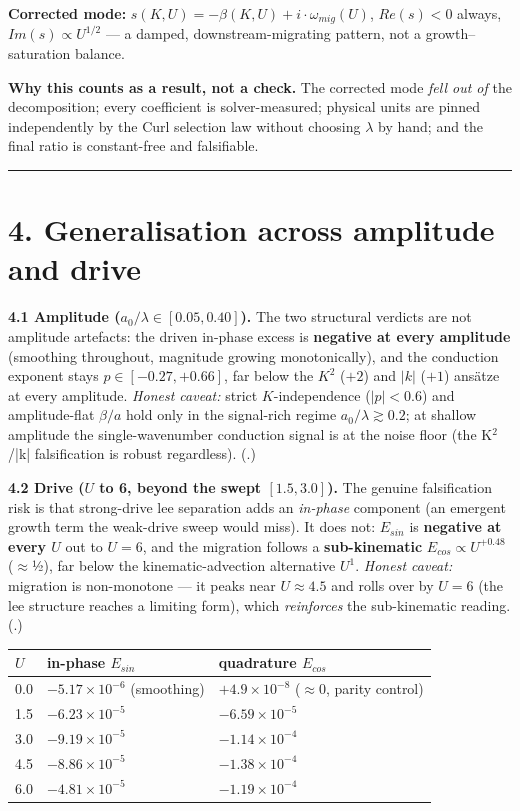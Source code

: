 \documentclass[11pt]{article}
\begin{document}
\textbf{Corrected mode:} $s(K,U) = -\beta (K,U) + i\cdot \omega _{mig}(U)$, $Re(s)<0$ always, $Im(s)\propto U^{1/2}$ — a damped, downstream-migrating pattern, not a growth–saturation balance.


\textbf{Why this counts as a result, not a check.} The corrected mode \emph{fell out of} the decomposition; every coefficient is solver-measured; physical units are pinned independently by the Curl selection law without choosing $\lambda $ by hand; and the final ratio is constant-free and falsifiable.


\medskip\hrule\medskip


\section*{4. Generalisation across amplitude and drive}


\textbf{4.1 Amplitude ($a_{0}/\lambda  \in  [0.05, 0.40]$).} The two structural verdicts are not amplitude artefacts: the driven in-phase excess is \textbf{negative at every amplitude} (smoothing throughout, magnitude growing monotonically), and the conduction exponent stays $p\in [-0.27,+0.66]$, far below the $K^{2}$ ($+2$) and $|k|$ ($+1$) ansätze at every amplitude. \emph{Honest caveat:} strict $K$-independence ($|p|<0.6$) and amplitude-flat $\beta /a$ hold only in the signal-rich regime $a_{0}/\lambda \gtrsim 0.2$; at shallow amplitude the single-wavenumber conduction signal is at the noise floor (the K\ensuremath{^{2}}/|k| falsification is robust regardless). (.)


\textbf{4.2 Drive ($U$ to 6, beyond the swept $[1.5,3.0]$).} The genuine falsification risk is that strong-drive lee separation adds an \emph{in-phase} component (an emergent growth term the weak-drive sweep would miss). It does not: $E_{sin}$ is \textbf{negative at every $U$} out to $U=6$, and the migration follows a \textbf{sub-kinematic} $E_{cos} \propto  U^{+0.48}$ (\ensuremath{\approx}½), far below the kinematic-advection alternative $U^{1}$. \emph{Honest caveat:} migration is non-monotone — it peaks near $U\approx 4.5$ and rolls over by $U=6$ (the lee structure reaches a limiting form), which \emph{reinforces} the sub-kinematic reading. (.)


\begin{center}\small
\begin{tabular}{lll}
\toprule
$U$ & in-phase $E_{sin}$ & quadrature $E_{cos}$ \\
\midrule
0.0 & $-5.17\times 10^{-6}$ (smoothing) & $+4.9\times 10^{-8}$ (\ensuremath{\approx}0, parity control) \\
1.5 & $-6.23\times 10^{-5}$ & $-6.59\times 10^{-5}$ \\
3.0 & $-9.19\times 10^{-5}$ & $-1.14\times 10^{-4}$ \\
4.5 & $-8.86\times 10^{-5}$ & $-1.38\times 10^{-4}$ \\
6.0 & $-4.81\times 10^{-5}$ & $-1.19\times 10^{-4}$ \\
\bottomrule
\end{tabular}
\end{center}
\end{document}
